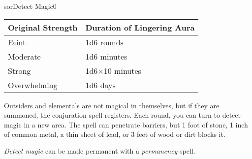 \begin{spellcard}{sor}{Detect Magic}{0}
  \begin{longtable}[]{@{}ll@{}}
    \toprule
    Original Strength & Duration of Lingering Aura\tabularnewline\midrule
    \endhead{}
    Faint             & 1d6 rounds\tabularnewline{}
    Moderate          & 1d6 minutes\tabularnewline{}
    Strong            & 1d6\(\times{}\)10 minutes\tabularnewline{}
    Overwhelming      & 1d6 days\tabularnewline\bottomrule
  \end{longtable}

  Outsiders and elementals are not magical in themselves, but if they are summoned,
  the conjuration spell registers.
  Each round, you can turn to detect magic in a new area.
  The spell can penetrate barriers, but 1 foot of stone, 1 inch of common metal,
  a thin sheet of lead, or 3 feet of wood or dirt blocks it.

  \emph{Detect magic} can be made permanent with a \emph{permanency} spell.

\end{spellcard}
